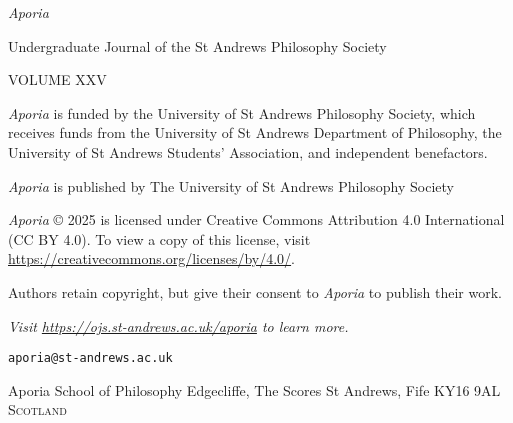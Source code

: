 \thispagestyle{empty}

\noindent
{\huge\textit{Aporia}}

\vspace{1cm}

\normalsize
\noindent Undergraduate Journal of the St Andrews Philosophy
Society

\vspace{1cm}
\noindent VOLUME XXV


\vspace{3cm}
\vfill

\noindent \textit{Aporia} is funded by the University of St
Andrews Philosophy Society, which receives funds from the
University of St Andrews
Department of Philosophy, the University of St Andrews
Students’ Association, and independent benefactors.

\noindent
\textit{Aporia} is published by The University of St Andrews
Philosophy Society

\vspace{1cm}
\noindent
\textit{Aporia} © 2025 is licensed under Creative Commons
Attribution 4.0 International (CC BY 4.0). To view a copy of
this license, visit
\url{https://creativecommons.org/licenses/by/4.0/}.

\vspace{1cm}
\noindent
Authors retain copyright, but give their consent to
\textit{Aporia} to publish their work.

\vspace{2cm}
\begin{multicols}{2}
\noindent
\textit{Visit \url{https://ojs.st-andrews.ac.uk/aporia} to learn more.}
\vspace{2cm}

\columnbreak
\noindent
\texttt{aporia@st-andrews.ac.uk}

\noindent
Aporia\newline
School of Philosophy\newline
Edgecliffe, The Scores\newline
St Andrews, Fife\newline
KY16 9AL\newline
\textsc{Scotland}
\end{multicols}
